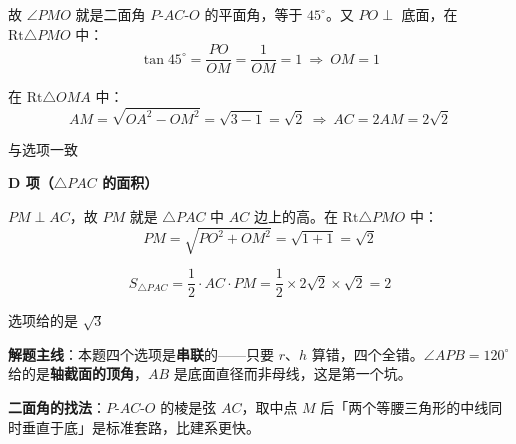\begin{answer}
故 $\angle PMO$ 就是二面角 $P\text{-}AC\text{-}O$ 的平面角，等于 $45^\circ$。又 $PO\perp$ 底面，在 $\mathrm{Rt}\triangle PMO$ 中：
\nopagebreak[4]
\[\tan45^\circ=\frac{PO}{OM}=\frac1{OM}=1\ \Longrightarrow\ OM=1\]

在 $\mathrm{Rt}\triangle OMA$ 中：
\nopagebreak[4]
\[AM=\sqrt{OA^{2}-OM^{2}}=\sqrt{3-1}=\sqrt2\ \Longrightarrow\ AC=2AM=2\sqrt2\]

与选项一致 

\par\medskip

\textbf{D 项（$\triangle PAC$ 的面积）}

$PM\perp AC$，故 $PM$ 就是 $\triangle PAC$ 中 $AC$ 边上的高。在 $\mathrm{Rt}\triangle PMO$ 中：
\nopagebreak[4]
\[PM=\sqrt{PO^{2}+OM^{2}}=\sqrt{1+1}=\sqrt2\]

\nopagebreak[4]
\[S_{\triangle PAC}=\frac12\cdot AC\cdot PM=\frac12\times2\sqrt2\times\sqrt2=2\]

选项给的是 $\sqrt3$ 

\par\medskip

\begin{gktip}
\textbf{解题主线}：本题四个选项是\textbf{串联}的——只要 $r$、$h$ 算错，四个全错。$\angle APB=120^\circ$ 给的是\textbf{轴截面的顶角}，$AB$ 是底面直径而非母线，这是第一个坑。

\textbf{二面角的找法}：$P\text{-}AC\text{-}O$ 的棱是弦 $AC$，取中点 $M$ 后「两个等腰三角形的中线同时垂直于底」是标准套路，比建系更快。
\end{gktip}


\par\medskip

\end{answer}

